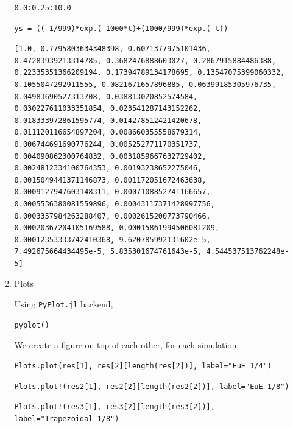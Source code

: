 \documentclass[11pt]{article}
\begin{document}
\begin{enumerate}
\begin{enumerate}
\begin{verbatim}
0.0:0.25:10.0
\end{verbatim}


\begin{verbatim}
ys = ((-1/999)*exp.(-1000*t)+(1000/999)*exp.(-t))
\end{verbatim}

\begin{verbatim}
[1.0, 0.7795803634348398, 0.6071377975101436, 0.47283939213314785, 0.3682476888603027, 0.2867915884486388, 0.22335351366209194, 0.17394789134178695, 0.13547075399060332, 0.1055047292911555, 0.0821671657896885, 0.06399185305976735, 0.04983690527313708, 0.038813020852574584, 0.030227611033351854, 0.023541287143152262, 0.018333972861595774, 0.014278512421420678, 0.011120116654897204, 0.008660355558679314, 0.006744691690776244, 0.005252771170351737, 0.004090862300764832, 0.0031859667632729402, 0.0024812334100764353, 0.00193238652275046, 0.0015049441371146873, 0.001172051672463638, 0.0009127947603148311, 0.0007108852741166657, 0.0005536380081559896, 0.00043117371428997756, 0.0003357984263288407, 0.0002615200773790466, 0.00020367204105169588, 0.00015861994506081209, 0.00012353333742410368, 9.620785992131602e-5, 7.492675664434495e-5, 5.835301674761643e-5, 4.544537513762248e-5]
\end{verbatim}

\item Plots
\label{sec:orgdb08cc9}

Using \texttt{PyPlot.jl} backend,
\begin{verbatim}
pyplot()
\end{verbatim}

We create a figure on top of each other, for each simulation,
\begin{verbatim}
Plots.plot(res[1], res[2][length(res[2])], label="EuE 1/4")
\end{verbatim}

\begin{verbatim}
Plots.plot!(res2[1], res2[2][length(res2[2])], label="EuE 1/8")
\end{verbatim}

\begin{verbatim}
Plots.plot!(res3[1], res3[2][length(res3[2])], label="Trapezoidal 1/8")
\end{verbatim}


\end{enumerate}
\end{enumerate}
\end{document}
